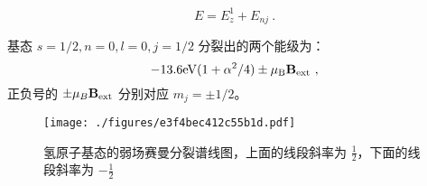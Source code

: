 \begin{equation}\label{eq_ZemEff_14}
E=E_z^1+E_{nj}~.
\end{equation}
\begin{example}{}
基态 $s=1/2,n=0,l=0,j=1/2$ 分裂出的两个能级为：
\begin{equation}\label{eq_ZemEff_16}
-13.6\rm{eV}(1+\alpha^2/4)\pm\mu_B\mathbf{B}_{\rm{ext}}\notag~,
\end{equation}
正负号的 $\pm\mu_B\mathbf{B}_{\rm{ext}}$ 分别对应 $m_j=\pm1/2$。\begin{figure}[ht]
\centering
\texttt{[image: ./figures/e3f4bec412c55b1d.pdf]}
\caption{氢原子基态的弱场赛曼分裂谱线图，上面的线段斜率为 $\frac{1}{2}$，下面的线段斜率为 $-\frac{1}{2}$} \label{fig_ZemEff_2}
\end{figure}
\end{example}
